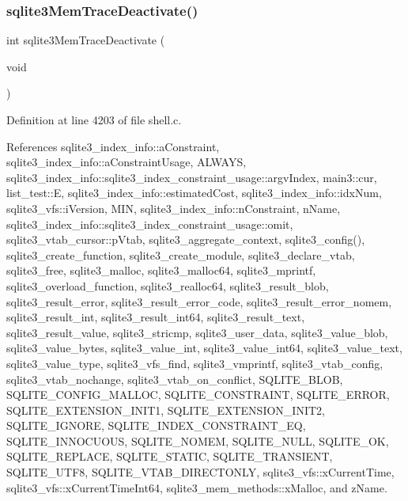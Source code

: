\subsubsection{sqlite3\+Mem\+Trace\+Deactivate()}
{\footnotesize\ttfamily int sqlite3\+Mem\+Trace\+Deactivate (\begin{DoxyParamCaption}\item[{void}]{ }\end{DoxyParamCaption})}



Definition at line 4203 of file shell.\+c.



References sqlite3\+\_\+index\+\_\+info\+::a\+Constraint, sqlite3\+\_\+index\+\_\+info\+::a\+Constraint\+Usage, A\+L\+W\+A\+YS, sqlite3\+\_\+index\+\_\+info\+::sqlite3\+\_\+index\+\_\+constraint\+\_\+usage\+::argv\+Index, main3\+::cur, list\+\_\+test\+::E, sqlite3\+\_\+index\+\_\+info\+::estimated\+Cost, sqlite3\+\_\+index\+\_\+info\+::idx\+Num, sqlite3\+\_\+vfs\+::i\+Version, M\+IN, sqlite3\+\_\+index\+\_\+info\+::n\+Constraint, n\+Name, sqlite3\+\_\+index\+\_\+info\+::sqlite3\+\_\+index\+\_\+constraint\+\_\+usage\+::omit, sqlite3\+\_\+vtab\+\_\+cursor\+::p\+Vtab, sqlite3\+\_\+aggregate\+\_\+context, sqlite3\+\_\+config(), sqlite3\+\_\+create\+\_\+function, sqlite3\+\_\+create\+\_\+module, sqlite3\+\_\+declare\+\_\+vtab, sqlite3\+\_\+free, sqlite3\+\_\+malloc, sqlite3\+\_\+malloc64, sqlite3\+\_\+mprintf, sqlite3\+\_\+overload\+\_\+function, sqlite3\+\_\+realloc64, sqlite3\+\_\+result\+\_\+blob, sqlite3\+\_\+result\+\_\+error, sqlite3\+\_\+result\+\_\+error\+\_\+code, sqlite3\+\_\+result\+\_\+error\+\_\+nomem, sqlite3\+\_\+result\+\_\+int, sqlite3\+\_\+result\+\_\+int64, sqlite3\+\_\+result\+\_\+text, sqlite3\+\_\+result\+\_\+value, sqlite3\+\_\+stricmp, sqlite3\+\_\+user\+\_\+data, sqlite3\+\_\+value\+\_\+blob, sqlite3\+\_\+value\+\_\+bytes, sqlite3\+\_\+value\+\_\+int, sqlite3\+\_\+value\+\_\+int64, sqlite3\+\_\+value\+\_\+text, sqlite3\+\_\+value\+\_\+type, sqlite3\+\_\+vfs\+\_\+find, sqlite3\+\_\+vmprintf, sqlite3\+\_\+vtab\+\_\+config, sqlite3\+\_\+vtab\+\_\+nochange, sqlite3\+\_\+vtab\+\_\+on\+\_\+conflict, S\+Q\+L\+I\+T\+E\+\_\+\+B\+L\+OB, S\+Q\+L\+I\+T\+E\+\_\+\+C\+O\+N\+F\+I\+G\+\_\+\+M\+A\+L\+L\+OC, S\+Q\+L\+I\+T\+E\+\_\+\+C\+O\+N\+S\+T\+R\+A\+I\+NT, S\+Q\+L\+I\+T\+E\+\_\+\+E\+R\+R\+OR, S\+Q\+L\+I\+T\+E\+\_\+\+E\+X\+T\+E\+N\+S\+I\+O\+N\+\_\+\+I\+N\+I\+T1, S\+Q\+L\+I\+T\+E\+\_\+\+E\+X\+T\+E\+N\+S\+I\+O\+N\+\_\+\+I\+N\+I\+T2, S\+Q\+L\+I\+T\+E\+\_\+\+I\+G\+N\+O\+RE, S\+Q\+L\+I\+T\+E\+\_\+\+I\+N\+D\+E\+X\+\_\+\+C\+O\+N\+S\+T\+R\+A\+I\+N\+T\+\_\+\+EQ, S\+Q\+L\+I\+T\+E\+\_\+\+I\+N\+N\+O\+C\+U\+O\+US, S\+Q\+L\+I\+T\+E\+\_\+\+N\+O\+M\+EM, S\+Q\+L\+I\+T\+E\+\_\+\+N\+U\+LL, S\+Q\+L\+I\+T\+E\+\_\+\+OK, S\+Q\+L\+I\+T\+E\+\_\+\+R\+E\+P\+L\+A\+CE, S\+Q\+L\+I\+T\+E\+\_\+\+S\+T\+A\+T\+IC, S\+Q\+L\+I\+T\+E\+\_\+\+T\+R\+A\+N\+S\+I\+E\+NT, S\+Q\+L\+I\+T\+E\+\_\+\+U\+T\+F8, S\+Q\+L\+I\+T\+E\+\_\+\+V\+T\+A\+B\+\_\+\+D\+I\+R\+E\+C\+T\+O\+N\+LY, sqlite3\+\_\+vfs\+::x\+Current\+Time, sqlite3\+\_\+vfs\+::x\+Current\+Time\+Int64, sqlite3\+\_\+mem\+\_\+methods\+::x\+Malloc, and z\+Name.


